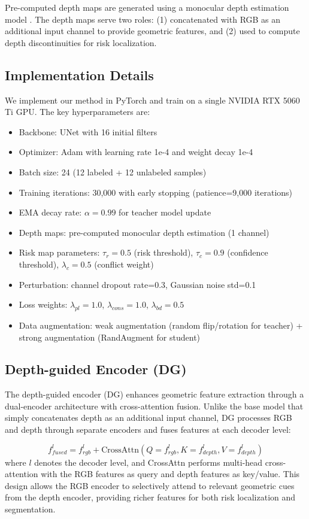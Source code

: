 \documentclass[conference]{IEEEtran}
\begin{document}
Pre-computed depth maps are generated using a monocular depth estimation model \cite{ranftl2021vision}. The depth maps serve two roles: (1) concatenated with RGB as an additional input channel to provide geometric features, and (2) used to compute depth discontinuities for risk localization.

\subsection{Implementation Details}
We implement our method in PyTorch and train on a single NVIDIA RTX 5060 Ti GPU. The key hyperparameters are:
\begin{itemize}
\item Backbone: UNet \cite{ronneberger2015u} with 16 initial filters
\item Optimizer: Adam with learning rate 1e-4 and weight decay 1e-4
\item Batch size: 24 (12 labeled + 12 unlabeled samples)
\item Training iterations: 30,000 with early stopping (patience=9,000 iterations)
\item EMA decay rate: $\alpha=0.99$ for teacher model update
\item Depth maps: pre-computed monocular depth estimation (1 channel)
\item Risk map parameters: $\tau_r=0.5$ (risk threshold), $\tau_c=0.9$ (confidence threshold), $\lambda_c=0.5$ (conflict weight)
\item Perturbation: channel dropout rate=0.3, Gaussian noise std=0.1
\item Loss weights: $\lambda_{pl}=1.0$, $\lambda_{cons}=1.0$, $\lambda_{bd}=0.5$
\item Data augmentation: weak augmentation (random flip/rotation for teacher) + strong augmentation (RandAugment for student)
\end{itemize}

\subsection{Depth-guided Encoder (DG)}

The depth-guided encoder (DG) enhances geometric feature extraction through a dual-encoder architecture with cross-attention fusion. Unlike the base model that simply concatenates depth as an additional input channel, DG processes RGB and depth through separate encoders and fuses features at each decoder level:

\begin{equation}
f_{fused}^l = f_{rgb}^l + \text{CrossAttn}(Q=f_{rgb}^l, K=f_{depth}^l, V=f_{depth}^l)
\end{equation}
where $l$ denotes the decoder level, and CrossAttn performs multi-head cross-attention with the RGB features as query and depth features as key/value. This design allows the RGB encoder to selectively attend to relevant geometric cues from the depth encoder, providing richer features for both risk localization and segmentation.
\end{document}
